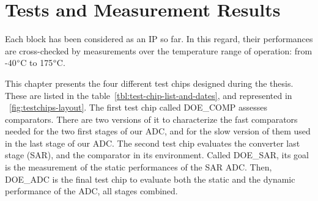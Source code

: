 \chapter{Tests and Measurement Results}
\label{sec:tests-meas}
\ifpdf
    \graphicspath{{Chapter5/Figs/Raster/}{Chapter5/Figs/PDF/}{Chapter5/Figs/}}
\else
    \graphicspath{{Chapter5/Figs/Vector/}{Chapter5/Figs/}}
\fi

Each block has been considered as an IP so far. In this regard, their performances are cross-checked by measurements over the temperature range of operation: from -40$\degree$C to 175$\degree$C.

This chapter presents the four different test chips designed during the thesis. These are listed in the table~\ref{tbl:test-chip-list-and-dates}, and represented in \figurename~\ref{fig:testchips-layout}. The first test chip called DOE\_COMP assesses comparators. There are two versions of it to characterize the fast comparators needed for the two first stages of our ADC, and for the slow version of them used in the last stage of our ADC. The second test chip evaluates the converter last stage (SAR), and the comparator in its environment. Called DOE\_SAR, its goal is the measurement of the static performances of the SAR ADC\@. Then, DOE\_ADC is the final test chip to evaluate both the static and the dynamic performance of the ADC, all stages combined.


